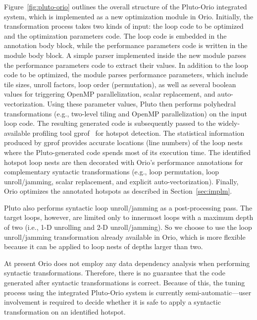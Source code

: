Figure~\ref{fig:pluto-orio} outlines the overall structure of the
Pluto-Orio integrated system, which is implemented as a new
optimization module in Orio. Initially, the transformation process
takes two kinds of input: the loop code to be optimized and the
optimization parameters code. The loop code is embedded in the
annotation body block, while the performance parameters code is
written in the module body block. A simple parser implemented inside
the new module parses the performance parameters code to extract their
values. In addition to the loop code to be optimized, the module
parses performance parameters, which include tile sizes, unroll
factors, loop order (permutation), as well as several boolean values
for triggering OpenMP parallelization, scalar replacement, and
auto-vectorization. Using these parameter values, Pluto then performs
polyhedral transformations (e.g., two-level tiling and OpenMP
parallelization) on the input loop code. The resulting generated code
is subsequently passed to the widely-available profiling tool
gprof~\cite{gprof} for hotspot detection. The statistical information
produced by gprof provides accurate locations (line numbers) of the
loop nests where the Pluto-generated code spends most of its execution
time. The identified hotspot loop nests are then decorated with Orio's
performance annotations for complementary syntactic transformations
(e.g., loop permutation, loop unroll/jamming, scalar replacement, and
explicit auto-vectorization). Finally, Orio optimizes the annotated
hotspots as described in Section~\ref{sec:implm}.

Pluto also performs syntactic loop unroll/jamming as a post-processing
pass. The target loops, however, are limited only to innermost loops with a
maximum depth of two (i.e., 1-D unrolling and 2-D unroll/jamming). So we
choose to use the loop unroll/jamming transformation already available in
Orio, which is more flexible because it can be applied to loop nests of
depths larger than two.



At present Orio does not employ any data dependency analysis when performing
syntactic transformations. Therefore, there is no guarantee that the code
generated after syntactic transformations is correct. Because of this, the
tuning process using the integrated Pluto-Orio system is currently
semi-automatic---user involvement is required to decide whether it is safe
to apply a syntactic transformation on an identified hotspot.



